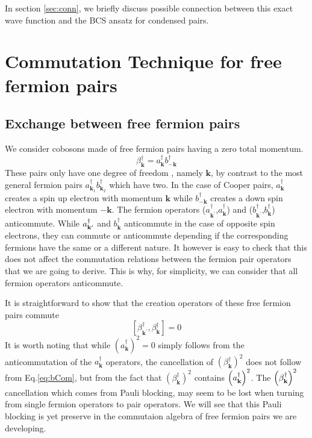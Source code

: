 \documentclass[aps,prb,superscriptaddress,twocolumn]{revtex4}
\newcommand{\vk}{\ensuremath{\mathbf{k}}}
\begin{document}
In section \ref{sec:conn}, we briefly discuss possible connection between this exact
wave function and the BCS ansatz for condensed pairs.

\section{Commutation Technique for free fermion pairs\label{sec:beta}}

\subsection{Exchange between free fermion pairs}

We consider cobosons made of free fermion pairs having a zero total
momentum. 
\begin{equation}
\beta^{\dagger}_\vk=a^{\dagger}_{\mathbf{k} }b^{\dagger}_{-\mathbf{k} }
\end{equation}
These pairs only have one degree of freedom
\cite{frenkel}
, namely $\mathbf{k}$, by contrast to the
most general fermion pairs $a^{\dagger}_{\mathbf{k} _1}b^{\dagger}_{\mathbf{k%
} _2}$ which have two. In the case of Cooper pairs, $a^{\dagger}_{\mathbf{k} }$ creates a spin up electron with momentum $\mathbf{k}$ while $b^{\dagger}_{\mathbf{-k} }$ creates a down spin electron with momentum $\mathbf{-k}$. The fermion operators ($a^{\dagger}_{\mathbf{k}
^{\prime}}$,$a^{\dagger}_{\mathbf{k} }$) and ($b^{\dagger}_{\mathbf{k}
^{\prime}}$,$b^{\dagger}_{\mathbf{k} }$) anticommute. While $a^{\dagger}_{%
\mathbf{k} ^{\prime}}$ and $b^{\dagger}_{\mathbf{k} }$
anticommute in the case of opposite spin electrons, they can commute or anticommute depending if the corresponding fermions have the same or a different
nature. It however is easy to check that this does not affect the commutation
relations between the fermion pair operators that we are going to derive. This is why, for simplicity, we can consider that all fermion operators anticommute. 

It is straightforward to show that the creation operators of these free fermion pairs commute 
\begin{equation}  \label{eq:bCom}
\left[\beta^{\dagger}_{\mathbf{k} ^{\prime}},\beta^{\dagger}_{\mathbf{k} }%
\right]  =0
\end{equation}
It is worth noting that while $\left(a^{\dagger}_{\mathbf{k} }\right) ^2=0$
simply follows from the anticommutation of the $a^{\dagger}_{\mathbf{k} }$
operators, the cancellation of $\left(\beta^{\dagger}_{\mathbf{k} }\right) ^2
$ does not follow from Eq.\eqref{eq:bCom}, but from the fact that $%
\left(\beta^{\dagger}_{\mathbf{k} }\right) ^2$ contains $\left(a^{\dagger}_{%
\mathbf{k} {}}\right) ^2$. The $\left(\beta^{\dagger}_{%
\mathbf{k} }\right) ^2$ cancellation which comes from Pauli blocking, may seem to be lost
when turning from single fermion operators to pair operators. We will see that this Pauli blocking is yet preserve in the commutaion algebra of
free fermion pairs we are developing.
\end{document}
